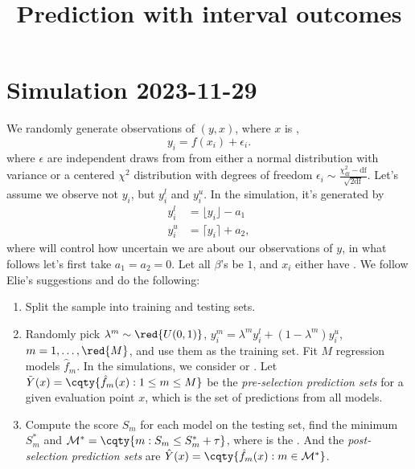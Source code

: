 \documentclass[12pt]{article}
\begin{document}
    \title{Prediction with interval outcomes}\author{}\date{}\maketitle

    \section{Simulation 2023-11-29}

    We randomly generate  observations of \((y,x)\), where \(x\) is ,
    \begin{equation*}
        y_{i} = f(x_{i}) + \epsilon_{i}.
    \end{equation*}
    where \(\epsilon\) are independent draws from from either a normal distribution with variance  or a centered \(\chi^{2}\) distribution with  degrees of freedom \(\epsilon_{i} \sim \frac{\chi^{2}_{\text{df}} - \text{df}}{\sqrt{2 \text{df}}}\). 
    Let's assume we observe not \(y_{i}\), but \(y^{l}_{i}\) and \(y_{i}^{u}\). In the simulation, it's generated by 
    \begin{align*}
        y_{i}^{l} &= \lfloor y_{i} \rfloor - a_{1} \\
        y_{i}^{u} &= \lceil y_{i} \rceil  + a_{2},
    \end{align*}
    where  will control how uncertain we are about our observations of \(y\), in what follows let's first take \(a_{1} = a_{2} = 0\). Let all \(\beta\)'s be \(1\), and \(x_{i}\) either have . We follow Elie's suggestions and do the following:
    \begin{enumerate}
        \item Split the sample into training and testing sets. 
        \item Randomly pick \(\lambda^{m} \sim \red{U(0,1)}\),  \(y^{m}_{i} = \lambda^{m}y^{l}_{i} + (1 - \lambda^{m}) y^{u}_{i}\), \(m = 1,\dots, \red{M}\), and use them as the training set. Fit \(M\) regression models \(\hat{f}_{m}\). In the simulations, we consider  or . Let \(\tilde{Y}(x) = \cqty{\hat{f}_{m}(x): 1\leq m\leq M}\) be the \textit{pre-selection prediction sets} for a given evaluation point \(x\), which is the set of predictions from all models.
        \item Compute the score \(S_{m}\) for each model on the testing set, find the  minimum \(S_{m}^{*}\) and \(\mathcal{M}^{*} = \cqty{m: S_{m} \leq S_{m}^{*} + \tau}\), where  is the . And the \textit{post-selection prediction sets} are \(\hat{Y}(x) = \cqty{\hat{f}_{m}(x): m\in \mathcal{M}^{*}}\).
    \end{enumerate}
\end{document}
